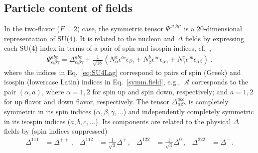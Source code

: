 \documentclass[nofootinbib, preprint, aps, prc, superscriptaddress,11pt]{revtex4-1}
\newcommand{\1}{\mathbbm{1}}
\newcommand{\D}{\ensuremath{\Delta}\xspace}
\begin{document}
\subsection{Particle content of fields}
In the two-flavor ($F=2$) case, the symmetric tensor $\Psi^{\mathcal{A}\mathcal{B}\mathcal{C}}$ is a 20-dimensional representation of SU(4). It is related to the nucleon and \D fields by expressing each SU(4) index in terms of a pair of spin and isospin indices, cf.~\cite{Kaplan:1995yg}, 
\begin{align}\label{symm.field}
    \Psi^{abc}_{\alpha\beta\gamma} = \Delta^{abc}_{\alpha\beta\gamma} + \frac{1}{\sqrt{18}} \left( N^a_\alpha \epsilon^{bc} \epsilon_{\beta\gamma} + N^b_\beta \epsilon^{ac} \epsilon_{\alpha\gamma} + N^c_\gamma \epsilon^{ab} \epsilon_{\alpha\beta}\right)\ .
\end{align}
where the indices in Eq.~\eqref{eq:SU4Lag} correspond to pairs of spin (Greek) and isospin (lowercase Latin) indices in Eq.~\eqref{symm.field}, e.g.,~$\mathcal{A}$ corresponds to the pair $(\alpha,a)$, where $\alpha=1,2$ for spin up and spin down, respectively; and $a=1,2$ for up flavor and down flavor, respectively.
The tensor $\Delta^{abc}_{\alpha\beta\gamma}$ is completely symmetric in its spin indices ($\alpha,\beta,\gamma,\ldots$) and independently  completely symmetric in its isospin indices ($a,b,c,\ldots$).
Its components are related to the physical \D fields by (spin indices suppressed)
\begin{align}
    \D^{111} & = \Delta^{++}\,, & \D^{112} &= \frac{1}{\sqrt{3}}\Delta^{+}\,, & \D^{122} &= \frac{1}{\sqrt{3}}\Delta^{0}\,, & \D^{222} &= \Delta^{-} \, .
\end{align}
\end{document}
